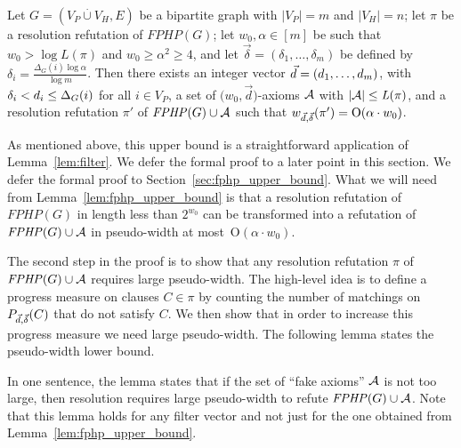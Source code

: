 \documentclass{article}
\makeatletter
\newcommand{\bigoh}[1]{\mathrm{O} ( #1 )}
\newcommand{\N}         {\mathbb{N}}
\providecommand{\abs}[1]{\lvert#1\rvert}
\newcommand{\setsize}[1]{\lvert#1\rvert}
\newcommand{\disjointunion}{\overset{.}{\cup}}
\newcommand{\refsec}[1]{Section~\ref{#1}}
\newcommand{\reflem}[1]{Lemma~\ref{#1}}
\newcommand{\refpi}{\pi}
\newcommand{\genericformsmall}[2]{\mathit{#1}( #2 )}
\newcommand{\length}[1]{\genericformsmall{L}{#1}}
\newcommand{\width}[2][]{\genericformsmall{W_{#1}}{#2}}
\newcommand{\formulaformat}[1]{\mathit{#1}}
\newcommand{\graphfphpnot}[1][G]{\formulaformat{FPHP}({#1})}
\newcommand{\GFPHP}{G\text{-}FPHP}
\renewcommand{\GFPHP}{\graphfphpnot[G]}
\renewcommand{\deg}[2][XXXXXXXXXXXX]{\Delta_{#1}(#2)}
\newcommand{\diff}{\xi}
\newcommand{\cdiff}{4}
\newcommand{\GdegMax}{\Delta}
\newcommand{\V}[1][]{V_{#1}}
\newcommand{\Vp}{\V[P]}
\newcommand{\Vh}{\V[H]}
\newcommand{\Ax}{\ensuremath\mathcal{A}}
\newcommand{\thr}[1]{ \ensuremath d_{{#1}} }
\newcommand{\vecthr}{\vec{d}}
\newcommand{\vecthrdef}[1]{\vecthr = \left(\thr{1}, \ldots, \thr{#1}\right)}
\newcommand{\adv}[1]{\delta_{{#1}}}
\newcommand{\vecadv}{\vec{\delta}}
\newcommand{\vecadvdef}[1]{\vecadv = \left(\adv{1}, \ldots, \adv{#1}\right)}
\newcommand{\Pthick}[1]{\ensuremath P_{\vecthr,\vecadv}(#1)}
\newcommand{\fakeaxiom}{$\bigl( w_0, \vecthr \bigr)$-axiom\xspace}
\newcommand{\pseudowidth}{pseudo-width\xspace}
\renewcommand{\width}[1]{\ensuremath w_{\vecthr,\vecadv}( #1 )}
\numberwithin{equation}{section}
\newcommand\IfRestateTF{%
  \ifx\label\thmt@gobble@label %
    \expandafter\@firstoftwo
  \else
    \expandafter\@secondoftwo
  \fi
}
\newcommand{\RestateRemark}{\IfRestateTF{{\normalfont\bfseries (Restated) }}{}}
\makeatother
\begin{document}
\begin{lemma}\label{lem:fphp_upper_bound}
  Let $G = (\Vp \disjointunion \Vh, E)$
  be a bipartite graph with
  $\setsize{ \Vp } = m$ and $\setsize{ \Vh } = n$;
  let $\refpi$ be a resolution refutation of $\GFPHP$;
  let $w_0, \alpha \in [m]$ be such that 
  $w_0 > \log \length{\refpi}$ and
  $w_0 \ge \alpha^2 \ge 4$,
  and
  let $\vecadvdef{m}$ be defined by 
  $\adv{i} = \frac{\deg[G]{i} \log \alpha}{\log m}$.
  Then
  there exists 
  an integer vector $\vecthrdef{m}$, with 
  $\adv{i} < \thr{i} \le \deg[G]{i}$ for all 
  $i \in \Vp$, a set of \fakeaxiom{s} $\Ax$
  with 
  $\abs{\Ax} \le \length{\refpi}$, and a resolution refutation 
  $\refpi'$ of $\GFPHP \cup \Ax$ such that
  $\width{\refpi'} = \bigoh{\alpha \cdot w_0}$.
\end{lemma}
As 
mentioned
above, this 
upper bound
is a straightforward application of 
\reflem{lem:filter}. 
{We defer the formal proof to a later point in this section.}
{We defer the formal proof to \refsec{sec:fphp_upper_bound}.}
What we will need from \reflem{lem:fphp_upper_bound} is that a
resolution refutation of $\GFPHP$ in length less than $2^{w_0}$ can be
transformed into a refutation of $\GFPHP \cup \Ax$ in \pseudowidth at
most~$\bigoh{\alpha \cdot w_0}$.

The second step in the proof is to show that 
any resolution 
refutation 
$\refpi$ of $\GFPHP \cup \Ax$
requires large \pseudowidth. The 
high-level 
idea is to define a  progress measure
on clauses $C \in \refpi$
by
counting the number of matchings on $\Pthick{C}$ 
that do not 
satisfy $C$. We then show that in order to increase this progress measure
we need large \pseudowidth.
The following lemma states the \pseudowidth lower bound.

In 
one
sentence, the lemma states that if 
the set of ``fake axioms'' 
$\Ax$ is not too large, 
then resolution requires large \pseudowidth
to refute $\GFPHP \cup \Ax$. Note that this lemma holds for
any filter vector and not just for the one 
obtained
from 
\reflem{lem:fphp_upper_bound}.
\end{document}

